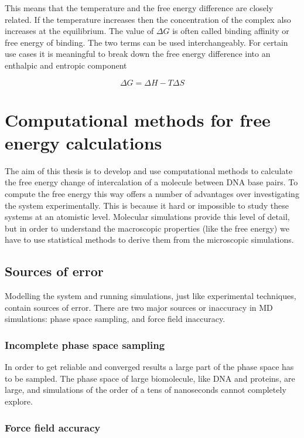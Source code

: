 \documentclass{report}
\begin{document}
This means that the temperature and the free energy difference are closely related. If the temperature increases then the concentration of the complex also increases at the equilibrium. The value of $\Delta G$ is often called binding affinity or free energy of binding. The two terms can be used interchangeably. For certain use cases it is meaningful to break down the free energy difference into an enthalpic and entropic component

\begin{equation}
  \Delta G = \Delta H - T \Delta S
\end{equation} 

\section{Computational methods for free energy calculations}

The aim of this thesis is to develop and use computational methods to calculate the free energy change of intercalation of a molecule between DNA base pairs. To compute the free energy this way offers a number of advantages over investigating the system experimentally. This is because it hard or impossible to study these systems at an atomistic level. Molecular simulations provide this level of detail, but in order to understand the macroscopic properties (like the free energy) we have to use statistical methods to derive them from the microscopic simulations. 

\subsection{Sources of error}

Modelling the system and running simulations, just like experimental techniques, contain sources of error. There are two major sources or inaccuracy in MD simulations: phase space sampling, and force field inaccuracy.

\subsubsection{Incomplete phase space sampling}

In order to get reliable and converged results a large part of the phase space has to be sampled. The phase space of large biomolecule, like DNA and proteins, are large, and simulations of the order of a tens of nanoseconds cannot completely explore.

\subsubsection{Force field accuracy}







\end{document}
